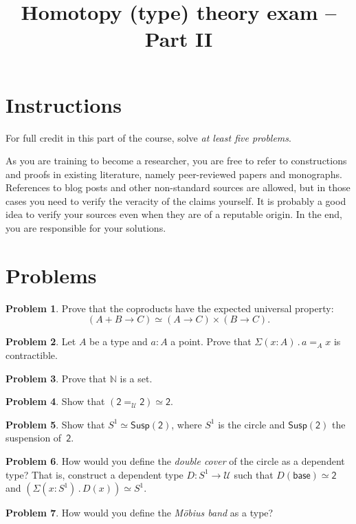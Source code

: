 \documentclass[12pt]{article}
\theoremstyle{definition}
\newtheorem{problem}{Problem}
\newcommand{\dsum}[1]{\Sigma (#1) \,.\,}
\newcommand{\univ}{\mathcal{U}}
\newcommand{\susp}[1]{\mathsf{Susp}(#1)}
\newcommand{\two}{\mathsf{2}}
\newcommand{\eqv}{\simeq}
\begin{document}
\title{Homotopy (type) theory exam -- Part II}
\author{}
\date{}
\maketitle

\section*{Instructions}

For full credit in this part of the course, solve \emph{at least five problems}.

As you are training to become a researcher, you are free to refer to constructions and
proofs in existing literature, namely peer-reviewed papers and monographs. References to
blog posts and other non-standard sources are allowed, but in those cases you need to
verify the veracity of the claims yourself. It is probably a good idea to verify your
sources even when they are of a reputable origin. In the end, you are responsible for your
solutions.

\section*{Problems}

\begin{problem}
  Prove that the coproducts have the expected universal property:
  \begin{equation*}
    (A + B \to C) \eqv (A \to C) \times (B \to C).
  \end{equation*}
\end{problem}

\begin{problem}
  Let $A$ be a type and $a : A$ a point. Prove that $\dsum{x : A} a =_A x$ is contractible.
\end{problem}

\begin{problem}
  Prove that $\mathbb{N}$ is a set.
\end{problem}

\begin{problem}
  Show that $(\two =_\univ \two) \eqv \two$.
\end{problem}

\begin{problem}
  Show that $S^1 \eqv \susp{\two}$, where $S^1$ is the circle and $\susp{\two}$ the
  suspension of~$\two$.
\end{problem}

\begin{problem}
  How would you define the \emph{double cover} of the circle as a dependent type? That is,
  construct a dependent type $D : S^1 \to \univ$ such that $D(\mathsf{base}) \eqv \two$
  and $(\dsum{x : S^1} D(x)) \eqv S^1$.
\end{problem}

\begin{problem}
  How would you define the \emph{Möbius band} as a type?
\end{problem}
\end{document}

